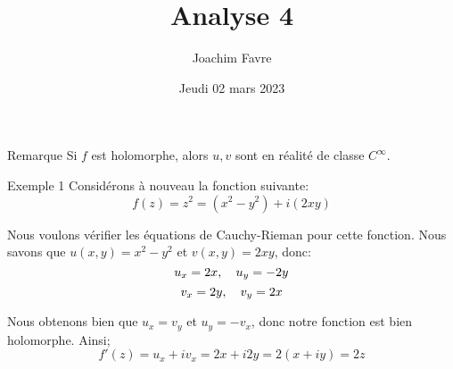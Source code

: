 \documentclass[a4paper]{article}
\title{Analyse 4}
\author{Joachim Favre}
\date{Jeudi 02 mars 2023}
\begin{document}
\maketitle


\begin{parag}{Remarque}
    Si $f$ est holomorphe, alors $u, v$ sont en réalité de classe $C^{\infty}$.
\end{parag}


\begin{parag}{Exemple 1}
    Considérons à nouveau la fonction suivante:
    \[f\left(z\right) = z^2 = \left(x^2 - y^2\right) + i\left(2xy\right)\]
     
    Nous voulons vérifier les équations de Cauchy-Rieman pour cette fonction. Nous savons que $u\left(x, y\right) = x^2 - y^2$ et $v\left(x, y\right) = 2xy$, donc: 
    \[u_x = 2x, \quad u_y = -2y\] 
    \[v_x = 2y, \quad v_y = 2x\]
    
    Nous obtenons bien que $u_x = v_y$ et $u_y = -v_x$, donc notre fonction est bien holomorphe. Ainsi; 
    \[f'\left(z\right) = u_x + i v_x = 2x + i 2y = 2\left(x + iy\right) = 2z\]
\end{parag}
\end{document}
